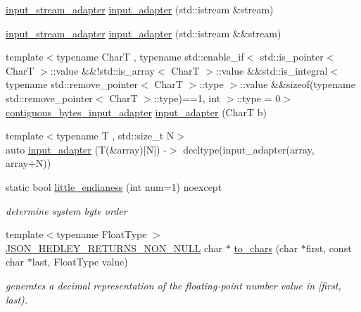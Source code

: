 \begin{DoxyCompactItemize}
\item 
\hyperlink{classnlohmann_1_1detail_1_1input__stream__adapter}{input\+\_\+stream\+\_\+adapter} \hyperlink{namespacenlohmann_1_1detail_af9fa97bf92767dc7f9dfe1abdfb1c6ce}{input\+\_\+adapter} (std\+::istream \&stream)
\item 
\hyperlink{classnlohmann_1_1detail_1_1input__stream__adapter}{input\+\_\+stream\+\_\+adapter} \hyperlink{namespacenlohmann_1_1detail_aaf150c2591ecac4e821e9036ef847ef8}{input\+\_\+adapter} (std\+::istream \&\&stream)
\item 
{\footnotesize template$<$typename CharT , typename std\+::enable\+\_\+if$<$ std\+::is\+\_\+pointer$<$ Char\+T $>$\+::value \&\&!std\+::is\+\_\+array$<$ Char\+T $>$\+::value \&\&std\+::is\+\_\+integral$<$ typename std\+::remove\+\_\+pointer$<$ Char\+T $>$\+::type $>$\+::value \&\&sizeof(typename std\+::remove\+\_\+pointer$<$ Char\+T $>$\+::type)==1, int $>$\+::type  = 0$>$ }\\\hyperlink{namespacenlohmann_1_1detail_abc51edd46a1d1a0ff06a19f08ceff563}{contiguous\+\_\+bytes\+\_\+input\+\_\+adapter} \hyperlink{namespacenlohmann_1_1detail_a690f7e555056ce490bd47dd5cdf9b48d}{input\+\_\+adapter} (CharT b)
\item 
{\footnotesize template$<$typename T , std\+::size\+\_\+t N$>$ }\\auto \hyperlink{namespacenlohmann_1_1detail_a7908f7aa06f20e6083619d1d4b4eb769}{input\+\_\+adapter} (T(\&array)\mbox{[}N\mbox{]}) -\/$>$ decltype(input\+\_\+adapter(array, array+N))
\item 
static bool \hyperlink{namespacenlohmann_1_1detail_ad2860d9bcd96cd7b8258a5b94674508c}{little\+\_\+endianess} (int num=1) noexcept
\begin{DoxyCompactList}\small\item\em determine system byte order \end{DoxyCompactList}\item 
{\footnotesize template$<$typename Float\+Type $>$ }\\\hyperlink{json_8hpp_a5f2aaec3b681d0a72f7d6e90b70cdcd1}{J\+S\+O\+N\+\_\+\+H\+E\+D\+L\+E\+Y\+\_\+\+R\+E\+T\+U\+R\+N\+S\+\_\+\+N\+O\+N\+\_\+\+N\+U\+LL} char $\ast$ \hyperlink{namespacenlohmann_1_1detail_a6cca370ac6c99294dbe4fe24716a57dd}{to\+\_\+chars} (char $\ast$first, const char $\ast$last, Float\+Type value)
\begin{DoxyCompactList}\small\item\em generates a decimal representation of the floating-\/point number value in \mbox{[}first, last). \end{DoxyCompactList}\end{DoxyCompactItemize}


